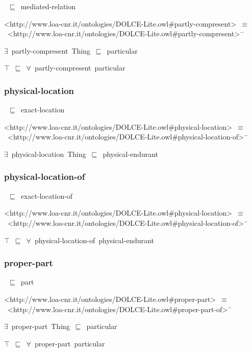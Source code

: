 \documentclass{article}
\begin{document}
~\ensuremath{\sqsubseteq}~mediated-relation

<http://www.loa-cnr.it/ontologies/DOLCE-Lite.owl#partly-compresent>~\ensuremath{\equiv}~<http://www.loa-cnr.it/ontologies/DOLCE-Lite.owl#partly-compresent>\ensuremath{^-}

\ensuremath{\exists}~partly-compresent~Thing~\ensuremath{\sqsubseteq}~particular

\ensuremath{\top}~\ensuremath{\sqsubseteq}~\ensuremath{\forall}~partly-compresent~particular

\subsubsection*{physical-location}

~\ensuremath{\sqsubseteq}~exact-location

<http://www.loa-cnr.it/ontologies/DOLCE-Lite.owl#physical-location>~\ensuremath{\equiv}~<http://www.loa-cnr.it/ontologies/DOLCE-Lite.owl#physical-location-of>\ensuremath{^-}

\ensuremath{\exists}~physical-location~Thing~\ensuremath{\sqsubseteq}~physical-endurant

\subsubsection*{physical-location-of}

~\ensuremath{\sqsubseteq}~exact-location-of

<http://www.loa-cnr.it/ontologies/DOLCE-Lite.owl#physical-location>~\ensuremath{\equiv}~<http://www.loa-cnr.it/ontologies/DOLCE-Lite.owl#physical-location-of>\ensuremath{^-}

\ensuremath{\top}~\ensuremath{\sqsubseteq}~\ensuremath{\forall}~physical-location-of~physical-endurant

\subsubsection*{proper-part}

~\ensuremath{\sqsubseteq}~part

<http://www.loa-cnr.it/ontologies/DOLCE-Lite.owl#proper-part>~\ensuremath{\equiv}~<http://www.loa-cnr.it/ontologies/DOLCE-Lite.owl#proper-part-of>\ensuremath{^-}



\ensuremath{\exists}~proper-part~Thing~\ensuremath{\sqsubseteq}~particular

\ensuremath{\top}~\ensuremath{\sqsubseteq}~\ensuremath{\forall}~proper-part~particular
\end{document}
